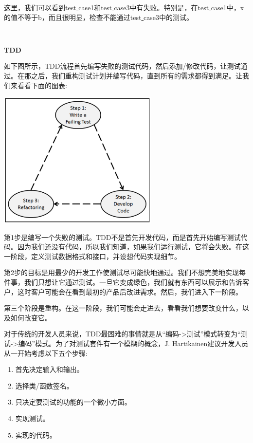 这里，我们可以看到test\underline{ }case1和test\underline{ }case3中有失败。特别是，在test\underline{ }case1中，x的值不等于b，而且很明显，检查不能通过test\underline{ }case3中的测试。 \par

\noindent\textbf{}\ \par
\textbf{TDD} \ \par
如下图所示，TDD流程首先编写失败的测试代码，然后添加/修改代码，让测试通过。在那之后，我们重构测试计划并编写代码，直到所有的需求都得到满足。让我们来看看下面的图表: \par

\begin{center}
	\includegraphics[width=0.6\textwidth]{content/Section-2/Chapter-13/2}
\end{center}

第1步是编写一个失败的测试。TDD不是首先开发代码，而是首先开始编写测试代码。因为我们还没有代码，所以我们知道，如果我们运行测试，它将会失败。在这一阶段，定义测试数据格式和接口，并设想代码实现细节。 \par
第2步的目标是用最少的开发工作使测试尽可能快地通过。我们不想完美地实现每件事，我们只想让它通过测试。一旦它变成绿色，我们就有东西可以展示和告诉客户，这时客户可能会在看到最初的产品后改进需求。然后，我们进入下一阶段。 \par
第三个阶段是重构。在这一阶段，我们可能会走进去，看看我们想要改变什么，以及如何改变它。\par
对于传统的开发人员来说，TDD最困难的事情就是从“编码->测试”模式转变为“测试->编码”模式。为了对测试套件有一个模糊的概念，J. Hartikainen建议开发人员从一开始考虑以下五个步骤: \par

\begin{enumerate}
	\item 首先决定输入和输出。
	\item 选择类/函数签名。 
	\item 只决定要测试的功能的一个微小方面。
	\item 实现测试。
	\item 实现的代码。
\end{enumerate}

